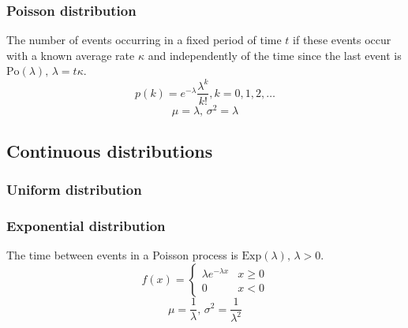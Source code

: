     \subsubsection{Poisson distribution}
    The number of events occurring in a fixed period of time $t$ if these events occur with a known average rate $\kappa$ and independently of the time since the last event is $\textrm{Po}(\lambda),\,\lambda=t\kappa$.
    \[p(k)=e^{-\lambda}\frac{\lambda^k}{k!}, k=0,1,2,\dots\]
    \[\mu=\lambda,\,\sigma^2=\lambda\]
    
    \subsection{Continuous distributions}
    
    \subsubsection{Uniform distribution}
    
    \subsubsection{Exponential distribution}
    The time between events in a Poisson process is $\textrm{Exp}(\lambda),\,\lambda>0$.
    \[f(x) = \left\{
    \begin{array}{cl}
    \lambda e^{-\lambda x} & x\geq0\\
    0 & x<0
    \end{array}\right.\]
    \[\mu=\frac{1}{\lambda},\,\sigma^2=\frac{1}{\lambda^2}\]
    
